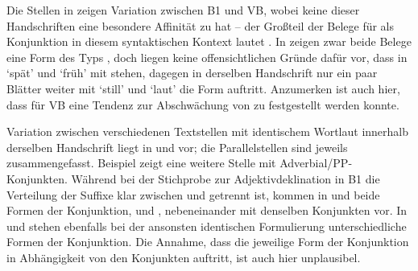 Die Stellen in  zeigen Variation zwischen B1
und VB, wobei keine dieser Handschriften eine besondere Affinität zu
 hat -- der Großteil der Belege für  als
Konjunktion in diesem syntaktischen Kontext lautet . In
 zeigen zwar beide Belege eine Form des Typs
, doch liegen keine offensichtlichen Gründe dafür vor, dass in
  `spät' und  `früh'
mit  stehen, dagegen in der\-selben Handschrift nur ein paar Blätter
weiter mit  `still' und  `laut' die Form
 auftritt. Anzumerken ist auch hier, dass für VB eine
Tendenz zur Abschwächung von  zu  festgestellt werden
konnte.

Variation zwischen verschiedenen Textstellen mit identischem Wortlaut innerhalb
der\-selben Handschrift liegt in  und 
vor; die Parallelstellen sind jeweils zusammengefasst. Beispiel
 zeigt eine weitere Stelle mit Adverbial/PP-Konjunkten.
Während bei der Stichprobe zur Adjektivdeklination in B1 die Verteilung der
Suffixe klar zwischen  und  getrennt ist, kommen in
 und  beide Formen der Konjunktion,
 und , nebeneinander mit denselben Konjunkten vor. In
 und  stehen ebenfalls bei der
ansonsten identischen Formulierung unterschiedliche Formen der Konjunktion. Die
Annahme, dass die jeweilige Form der Konjunktion in Abhängigkeit von den
Konjunkten auftritt, ist auch hier unplausibel.

